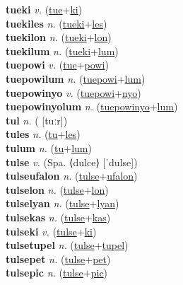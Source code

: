 \textbf{tueki} \textit{v.} (\hyperref[tue]{tue}+\hyperref[ki]{ki})
 \label{tueki} \\
\textbf{tuekiles} \textit{n.} (\hyperref[tueki]{tueki}+\hyperref[les]{les})
 \label{tuekiles} \\
\textbf{tuekilon} \textit{n.} (\hyperref[tueki]{tueki}+\hyperref[lon]{lon})
 \label{tuekilon} \\
\textbf{tuekilum} \textit{n.} (\hyperref[tueki]{tueki}+\hyperref[lum]{lum})
 \label{tuekilum} \\
\textbf{tuepowi} \textit{v.} (\hyperref[tue]{tue}+\hyperref[powi]{powi})
 \label{tuepowi} \\
\textbf{tuepowilum} \textit{n.} (\hyperref[tuepowi]{tuepowi}+\hyperref[lum]{lum})
 \label{tuepowilum} \\
\textbf{tuepowinyo} \textit{v.} (\hyperref[tuepowi]{tuepowi}+\hyperref[nyo]{nyo})
 \label{tuepowinyo} \\
\textbf{tuepowinyolum} \textit{n.} (\hyperref[tuepowinyo]{tuepowinyo}+\hyperref[lum]{lum})
 \label{tuepowinyolum} \\
\textbf{tul} \textit{n.} ( [tuːr])
 \label{tul} \\
\textbf{tules} \textit{n.} (\hyperref[tu]{tu}+\hyperref[les]{les})
 \label{tules} \\
\textbf{tulum} \textit{n.} (\hyperref[tu]{tu}+\hyperref[lum]{lum})
 \label{tulum} \\
\textbf{tulse} \textit{v.} (Spa. ⟨dulce⟩ [ˈdulse])
 \label{tulse} \\
\textbf{tulseufalon} \textit{n.} (\hyperref[tulse]{tulse}+\hyperref[ufalon]{ufalon})
 \label{tulseufalon} \\
\textbf{tulselon} \textit{n.} (\hyperref[tulse]{tulse}+\hyperref[lon]{lon})
 \label{tulselon} \\
\textbf{tulselyan} \textit{n.} (\hyperref[tulse]{tulse}+\hyperref[lyan]{lyan})
 \label{tulselyan} \\
\textbf{tulsekas} \textit{n.} (\hyperref[tulse]{tulse}+\hyperref[kas]{kas})
 \label{tulsekas} \\
\textbf{tulseki} \textit{v.} (\hyperref[tulse]{tulse}+\hyperref[ki]{ki})
 \label{tulseki} \\
\textbf{tulsetupel} \textit{n.} (\hyperref[tulse]{tulse}+\hyperref[tupel]{tupel})
 \label{tulsetupel} \\
\textbf{tulsepet} \textit{n.} (\hyperref[tulse]{tulse}+\hyperref[pet]{pet})
 \label{tulsepet} \\
\textbf{tulsepic} \textit{n.} (\hyperref[tulse]{tulse}+\hyperref[pic]{pic})
